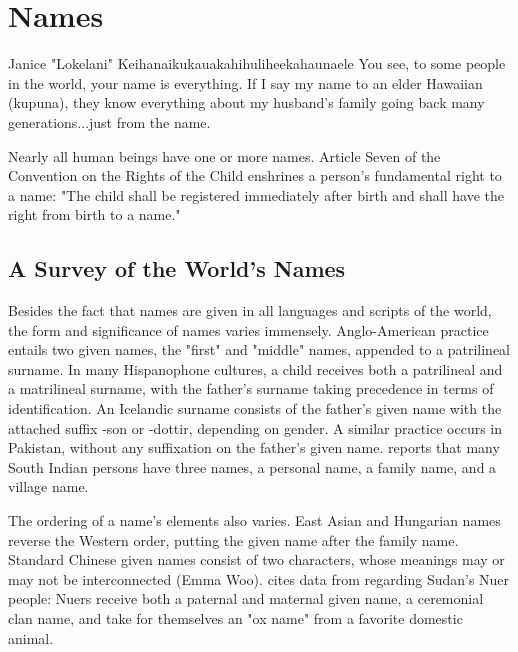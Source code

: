 \section{Names}

\begin{aquote}{Janice "Lokelani" Keihanaikukauakahihuliheekahaunaele}
You see, to some people in the world, your name is everything. If I say my name
to an elder Hawaiian (kupuna), they know everything about my husband's family
going back many generations...just from the name. \parencite{lee-valley}
\end{aquote}

Nearly all human beings have one or more names. Article Seven of the Convention on
the Rights of the Child enshrines a person's fundamental right to a name: "The
child shall be registered immediately after birth and shall have the right from
birth to a name." \parencite{crc}

\subsection{A Survey of the World's Names}

Besides the fact that names are given in all languages and scripts of the world,
the form and significance of names varies immensely. Anglo-American practice
entails two given names, the "first" and "middle" names, appended to a
patrilineal surname. In many Hispanophone cultures, a child receives both a
patrilineal and a matrilineal surname, with the father's surname taking
precedence in terms of identification. An Icelandic surname consists of the
father's given name with the attached suffix -son or -dottir, depending on
gender. A similar practice occurs in Pakistan, without any suffixation on the
father's given name. \textcite{finch08} reports that many South Indian persons
have three names, a personal name, a family name, and a village name.

The ordering of a name's elements also varies. East Asian and Hungarian names
reverse the Western order, putting the given name after the family name.
Standard Chinese given names consist of two characters, whose meanings may or
may not be interconnected (Emma Woo). \textcite{wardhaugh92} cites data from
\textcite{evans-pritchard48} regarding Sudan's Nuer people: Nuers receive both a
paternal and maternal given name, a ceremonial clan name, and take for
themselves an "ox name" from a favorite domestic animal.

